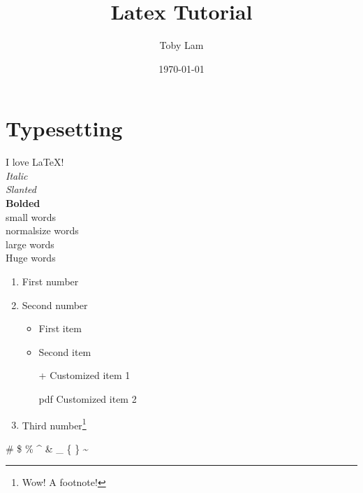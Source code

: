 \documentclass[a4paper]{report}
\begin{document}
\title{\Huge Latex Tutorial}
\author{Toby Lam}
\date{\today}
\maketitle

\tableofcontents

\newpage

\chapter{Typesetting}
\label{interests}

\indent
\indent
I love \LaTeX! \\

\noindent
\textit{Italic} \\
\textsl{Slanted} \\
\textbf{Bolded} \\

\noindent
{\small small words} \\
{\normalsize normalsize words} \\
{\large large words} \\

\vspace{2pt}
\noindent
{\huge Huge \hspace{1pt} words} \\

\normalsize

\begin{enumerate}
	\item First number
	\item Second number
	\begin{itemize}
		\item First item
		\item Second item
		\item[+] Customized item 1
		\item[pdf] Customized item 2
	\end{itemize}
	\item Third number\footnote{Wow! A footnote!}
\end{enumerate}

 \#  \$  \%  \^{} \&  \_  \{  \}  \~{} \\
\end{document}
